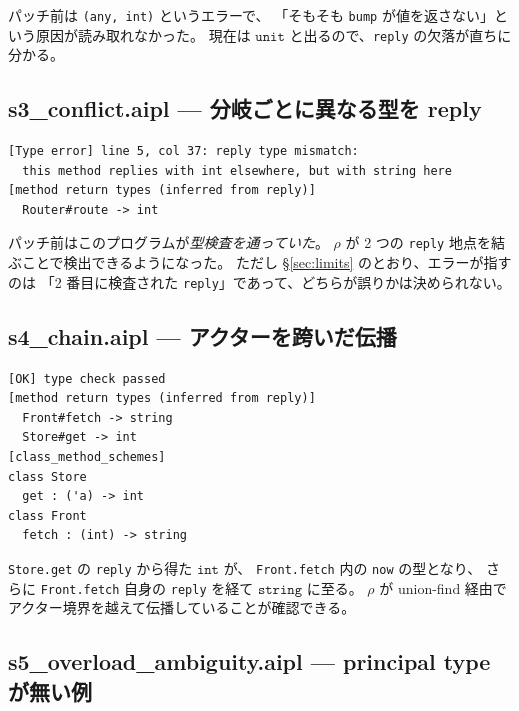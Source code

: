 \documentclass[11pt,a4paper]{ltjsarticle}
\theoremstyle{definition}
\theoremstyle{remark}
\newcommand{\ty}[1]{\ensuremath{\mathtt{#1}}}
\begin{document}
パッチ前は \texttt{(any, int)} というエラーで、
「そもそも \texttt{bump} が値を返さない」という原因が読み取れなかった。
現在は \ty{unit} と出るので、\texttt{reply} の欠落が直ちに分かる。

\subsection{s3\_conflict.aipl --- 分岐ごとに異なる型を reply}



\begin{lstlisting}[language={}]
[Type error] line 5, col 37: reply type mismatch:
  this method replies with int elsewhere, but with string here
[method return types (inferred from reply)]
  Router#route -> int
\end{lstlisting}

パッチ前はこのプログラムが\emph{型検査を通っていた}。
$\rho$ が 2 つの \texttt{reply} 地点を結ぶことで検出できるようになった。
ただし \S\ref{sec:limits} のとおり、エラーが指すのは
「2 番目に検査された \texttt{reply}」であって、どちらが誤りかは決められない。

\subsection{s4\_chain.aipl --- アクターを跨いだ伝播}



\begin{lstlisting}[language={}]
[OK] type check passed
[method return types (inferred from reply)]
  Front#fetch -> string
  Store#get -> int
[class_method_schemes]
class Store
  get : ('a) -> int
class Front
  fetch : (int) -> string
\end{lstlisting}

\texttt{Store.get} の \texttt{reply} から得た \ty{int} が、
\texttt{Front.fetch} 内の \texttt{now} の型となり、
さらに \texttt{Front.fetch} 自身の \texttt{reply} を経て \ty{string} に至る。
$\rho$ が union-find 経由でアクター境界を越えて伝播していることが確認できる。

\subsection{s5\_overload\_ambiguity.aipl --- principal type が無い例}


\end{document}
